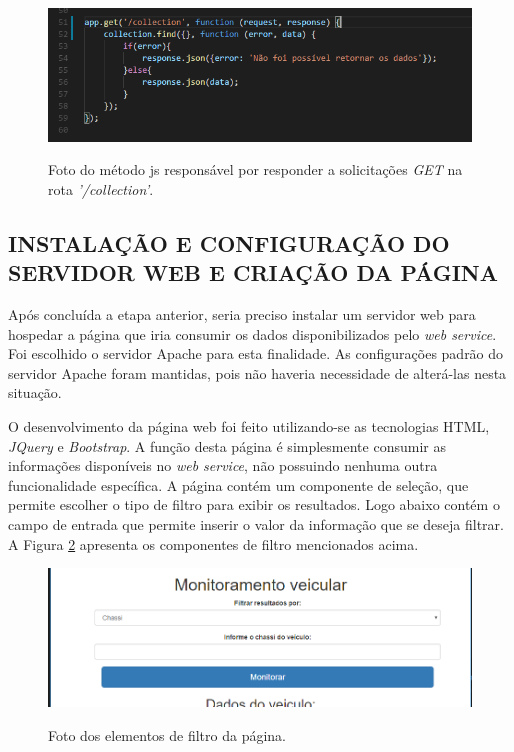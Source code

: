 \begin{figure}[!ht]
\centering
\caption{Foto do método js responsável por responder a solicitações \textit{GET} na rota \textit{'/collection'}.} 
{\includegraphics[scale=.66]{imagens/GET-collection_webservice.png}}\\
 \label{Fig:get_collection}
\end{figure}

\subsection{INSTALAÇÃO E CONFIGURAÇÃO DO SERVIDOR WEB E CRIAÇÃO DA PÁGINA}
Após concluída a etapa anterior, seria preciso instalar um servidor web para hospedar a página que iria consumir os dados disponibilizados pelo \textit{web service}. Foi escolhido o servidor Apache para esta finalidade. As configurações padrão do servidor Apache foram mantidas, pois não haveria necessidade de alterá-las nesta situação.

O desenvolvimento da página web foi feito utilizando-se as tecnologias HTML, \textit{JQuery} e \textit{Bootstrap}. A função desta página é simplesmente consumir as informações disponíveis no \textit{web service}, não possuindo nenhuma outra funcionalidade específica. A página contém um componente de seleção, que permite escolher o tipo de filtro para exibir os resultados. Logo abaixo contém o campo de entrada que permite inserir o valor da informação que se deseja filtrar. A Figura \ref{Fig:input_fitros} apresenta os componentes de filtro mencionados acima.

\begin{figure}[!ht]
\centering
\caption{Foto dos elementos de filtro da página.} 
{\includegraphics[scale=.62]{imagens/paginaweb_inputs.png}}\\
 \label{Fig:input_fitros}
\end{figure}

